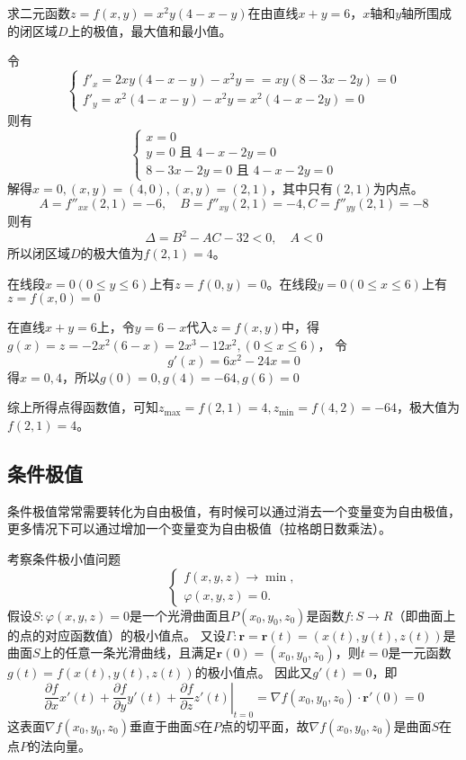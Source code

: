 \begin{example}
    求二元函数$z=f(x,y)=x^2y(4-x-y)$在由直线$x+y=6$，$x$轴和$y$轴所围成的闭区域$D$上的极值，最大值和最小值。
\end{example}
\begin{solution}
    令
    \[
        \begin{cases}
            f'_x  = 2xy(4-x-y) - x^2y = = xy(8-3x-2y) =  0 \\
            f'_y  = x^2(4-x-y) - x^2y = x^2(4-x-2y) = 0
        \end{cases}
    \]
    则有
    \[
        \begin{cases}
            x = 0                        \\
            y = 0 \text{ 且~} 4-x-2y = 0 \\
            8-3x-2y = 0 \text{ 且~} 4-x-2y = 0
        \end{cases}
    \]
    解得$x=0, (x,y)=(4,0), (x,y)=(2,1)$，其中只有$(2,1)$为内点。
    \[ A = f''_{xx}(2,1) = -6 ,\quad B = f''_{xy}(2,1) = -4, C = f''_{yy}(2,1) = -8 \]
    则有
    \[ \Delta = B^2 -AC -32 < 0,\quad A < 0 \]
    所以闭区域$D$的极大值为$f(2,1)=4$。

    在线段$x=0(0\leq y \leq 6)$上有$z=f(0,y)=0$。在线段$y=0(0\leq x\leq 6)$上有$z=f(x,0)=0$

    在直线$x+y=6$上，令$y=6-x$代入$z=f(x,y)$中，得$g(x) = z =-2x^2(6-x)=2x^3-12x^2,(0\leq x\leq 6)$，
    令
    \[ g'(x) = 6x^2 -24x =0 \]
    得$x = {0, 4}$，所以$g(0) = 0, g(4) = -64, g(6) = 0$

    综上所得点得函数值，可知$z_{\max} = f(2,1) = 4, z_{\min} = f(4,2) = -64$，极大值为$f(2,1)=4$。


\end{solution}

\subsection{条件极值}
条件极值常常需要转化为自由极值，有时候可以通过消去一个变量变为自由极值，更多情况下可以通过增加一个变量变为自由极值（拉格朗日数乘法）。

考察条件极小值问题
\[
    \begin{cases}
        f(x,y,z) \to \min, \\
        \varphi(x,y,z) = 0.
    \end{cases}
\]
假设$S:\varphi(x,y,z)=0$是一个光滑曲面且$P(x_0,y_0,z_0)$是函数$f:S\to R$（即曲面上的点的对应函数值）的极小值点。
又设$\Gamma : \bm{r} = \bm{r}(t) = (x(t),y(t),z(t))$是曲面$S$上的任意一条光滑曲线，且满足$\bm{r}(0)=(x_0,y_0,z_0)$，则$t=0$是一元函数$g(t)=f(x(t),y(t),z(t))$的极小值点。
因此又$g'(t)=0$，即
\[
    \left.\frac{\partial f}{\partial x}x'(t) + \frac{\partial f}{\partial y}y'(t) + \frac{\partial f}{\partial z}z'(t)\right|_{t=0}
    =
    \nabla f(x_0,y_0,z_0) \cdot \bm{r}'(0) = 0
\]
这表面$\nabla f(x_0,y_0,z_0)$垂直于曲面$S$在$P$点的切平面，故$\nabla f(x_0,y_0,z_0)$是曲面$S$在点$P$的法向量。

